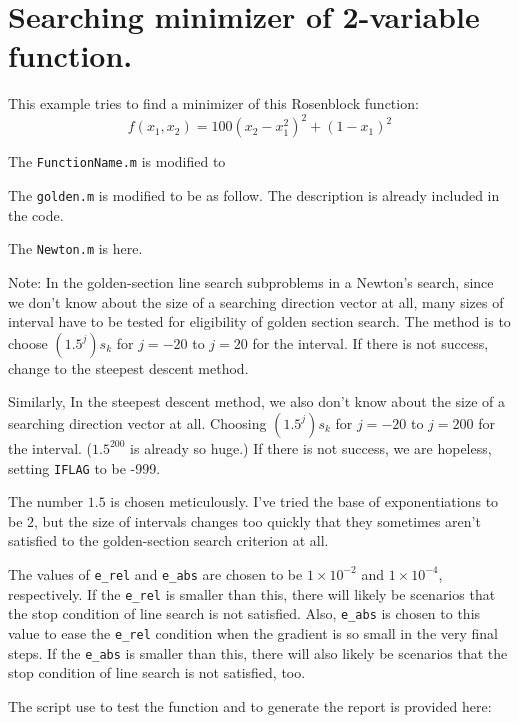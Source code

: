 \documentclass{article}
\begin{document}
\section*{Searching minimizer of 2-variable function.}

This example tries to find a minimizer of this Rosenblock function:
$$f(x_1,x_2) = 100( x_2 - x_1^2 )^2 + ( 1 - x_1 )^2$$

The \lstinline{FunctionName.m} is modified to



The \lstinline{golden.m} is modified to be as follow. The description is already included in the code.



The \lstinline{Newton.m} is here.



Note: In the golden-section line search subproblems in a Newton's search, since we don't know about the size of a searching direction vector at all, many sizes of interval have to be tested for eligibility of golden section search. The method is to choose $(1.5^j)s_k$ for $j = -20$ to $j = 20$ for the interval. If there is not success, change to the steepest descent method.

Similarly, In the steepest descent method, we also don't know about the size of a searching direction vector at all. Choosing $(1.5^j)s_k$ for $j = -20$ to $j = 200$ for the interval. ($1.5^{200}$ is already so huge.) If there is not success, we are hopeless, setting \lstinline{IFLAG} to be -999.

The number $1.5$ is chosen meticulously. I've tried the base of exponentiations to be $2$, but the size of intervals changes too quickly that they sometimes aren't satisfied to the golden-section search criterion at all.

The values of \lstinline{e_rel} and \lstinline{e_abs} are chosen to be $1 \times 10^{-2}$ and $1 \times 10^{-4}$, respectively. If the \lstinline{e_rel} is smaller than this, there will likely be scenarios that the stop condition of line search is not satisfied. Also, \lstinline{e_abs} is chosen to this value to ease the \lstinline{e_rel} condition when the gradient is so small in the very final steps. If the \lstinline{e_abs} is smaller than this, there will also likely be scenarios that the stop condition of line search is not satisfied, too.

The script use to test the function and to generate the report is provided here:
\end{document}
